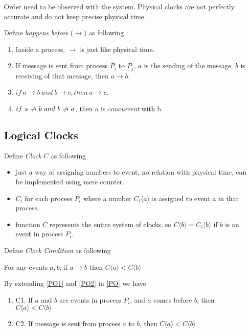 \documentclass[12pt,a4paper,oneside]{article}
\begin{document}
Order need to be observed with the system.
Physical clocks are not perfectly accurate and do not keep precise physical time\cite{l}.

Define \textit{happens before} ($\rightarrow$) as following

\begin{enumerate}
  \item \label{PO1} Inside a process, $\rightarrow$ is just like physical time.
  \item \label{PO2} If message is sent from process $P_i$ to $P_j$,
  $a$ is the sending of the message,  $b$ is receiving of that message, then $a \rightarrow b$.
  \item $if\ a \rightarrow b\ and\ b \rightarrow c, then\ a \rightarrow c$.
  \item $if\ a \centernot\rightarrow b\ and\ b \centernot\rightarrow a$, then a is \textit{concurrent} with b.
\end{enumerate}

\subsection{Logical Clocks} \label{LC}

Define \textit{Clock} $C$ as following\cite{l}

\begin{itemize}
  \item just a way of assigning numbers to event, no relation with physical time, can be implemented using mere counter.
  \item $C_i$ for each process $P_i$ where a number $C_i\langle a \rangle$ is assigned to event $a$ in that process.
  \item function $C$ represents the entire system of clocks, so $C\langle b \rangle = C_i \langle b \rangle$ if $b$ is an event in process $P_i$.
\end{itemize}

Define \textit{Clock Condition} as following

\medskip

For any events $a, b$: if $a \rightarrow b$ then $C\langle a \rangle < C\langle b \rangle$

\medskip

By extending \ref{PO1} and \ref{PO2} in \ref{PO} we have

\begin{enumerate}
  \item \label{C1} C1. If $a$ and $b$ are events in process $P_i$, and $a$ comes before $b$, then $C\langle a \rangle < C\langle b \rangle$\cite{l}
  \item \label{C2} C2. If message is sent from process $a$ to $b$, then $C\langle a \rangle < C\langle b \rangle$\
\end{enumerate}
\end{document}
